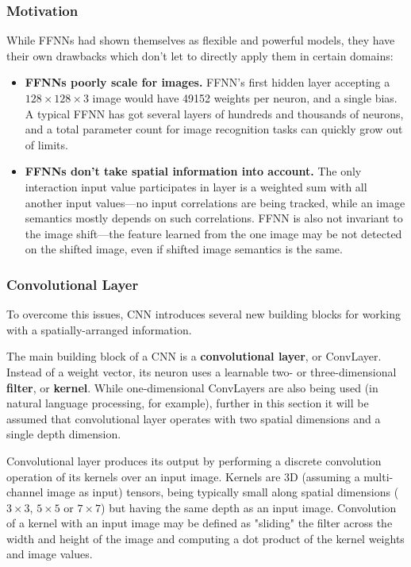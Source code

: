 \documentclass[thesis=B,english]{FITthesis}[2019/12/23]
\begin{document}
	\subsubsection{Motivation}
	
	While FFNNs had shown themselves as flexible and powerful models, they have their own drawbacks which don't let to directly apply them in certain domains:
	\begin{itemize}
		\item \textbf{FFNNs poorly scale for images.} FFNN's first hidden layer accepting a $128 \times 128 \times 3$ image would have 49152 weights per neuron, and a single bias. A typical FFNN has got several layers of hundreds and thousands of neurons, and a total parameter count for image recognition tasks can quickly grow out of limits.
		\item \textbf{FFNNs don't take spatial information into account.} The only interaction input value participates in layer is a weighted sum with all another input values---no input correlations are being tracked, while an image semantics mostly depends on such correlations. FFNN is also not invariant to the image shift---the feature learned from the one image may be not detected on the shifted image, even if shifted image semantics is the same.
	\end{itemize}
	
	\subsubsection{Convolutional Layer}
	
	To overcome this issues, CNN introduces several new building blocks for working with a spatially-arranged information.
	
	The main building block of a CNN is a \textbf{convolutional layer}, or ConvLayer. Instead of a weight vector, its neuron uses a learnable two- or three-dimensional \textbf{filter}, or \textbf{kernel}. While one-dimensional ConvLayers are also being used (in natural language processing, for example), further in this section it will be assumed that convolutional layer operates with two spatial dimensions and a single depth dimension.
	
	Convolutional layer produces its output by performing a discrete convolution operation of its kernels over an input image. Kernels are 3D (assuming a multi-channel image as input) tensors, being typically small along spatial dimensions ($3 \times 3$, $5 \times 5$ or $7 \times 7$) but having the same depth as an input image. Convolution of a kernel with an input image may be defined as "sliding" the filter across the width and height of the image and computing a dot product of the kernel weights and image values.
	
\end{document}
